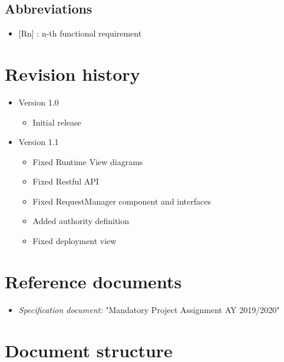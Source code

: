 			\subsection{Abbreviations}
				\begin{itemize}
					\item {[Rn]} : n-th functional requirement
				\end{itemize}
		\section{Revision history}
			\begin{itemize}
				\item Version 1.0
					\begin{itemize}
						\item Initial release
					\end{itemize}
				\item Version 1.1
					\begin{itemize}
						\item Fixed Runtime View diagrams
						\item Fixed Restful API
						\item Fixed RequestManager component and interfaces
						\item Added authority definition
						\item Fixed deployment view
					\end{itemize}
			\end{itemize}
		\section{Reference documents}
			\begin{itemize}
				\item \textit{Specification document:} "Mandatory Project Assignment AY 2019/2020"
			\end{itemize}
		\section{Document structure}
